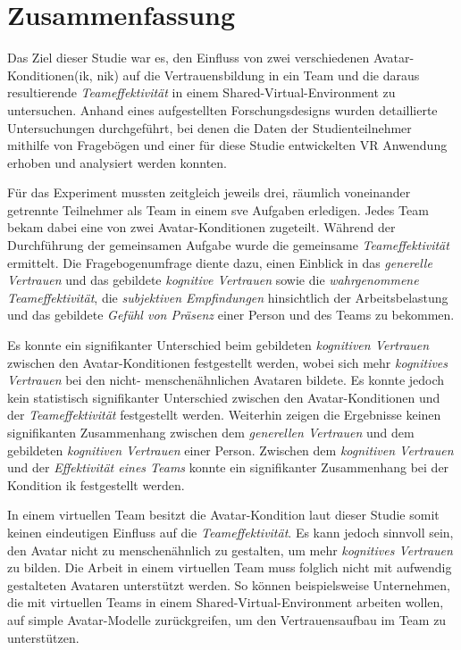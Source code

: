 \documentclass[a4paper,11pt]{article}%
\renewcommand{\\}{\vspace*{0.5\baselineskip} \newline}
\begin{document}
{{\section{Zusammenfassung}
Das Ziel dieser Studie war es, den Einfluss von zwei verschiedenen Avatar-Konditionen\newline (\ac{ik}, \ac{nik}) auf die Vertrauensbildung in ein Team und die daraus resultierende \textit{Teameffektivität} in einem Shared-Virtual-Environment zu untersuchen. 
Anhand eines aufgestellten Forschungsdesigns wurden detaillierte Untersuchungen durchgeführt, bei denen die Daten der Studienteilnehmer mithilfe von Fragebögen und einer für diese Studie entwickelten VR Anwendung erhoben und analysiert werden konnten.

Für das Experiment mussten zeitgleich jeweils drei, räumlich voneinander getrennte Teilnehmer als Team in einem \ac{sve} Aufgaben erledigen. Jedes Team bekam dabei eine von zwei Avatar-Konditionen zugeteilt. Während der Durchführung der gemeinsamen Aufgabe wurde die gemeinsame \textit{Teameffektivität} ermittelt. Die Fragebogenumfrage diente dazu, einen Einblick in das \textit{generelle Vertrauen} und das gebildete \textit{kognitive Vertrauen} sowie die \textit{wahrgenommene Teameffektivität}, die \textit{subjektiven Empfindungen} hinsichtlich der Arbeitsbelastung und das gebildete \textit{Gefühl von Präsenz} einer Person und des Teams zu bekommen.

Es konnte ein signifikanter Unterschied beim gebildeten \textit{kognitiven Vertrauen} zwischen den Avatar-Konditionen festgestellt werden, wobei sich mehr \textit{kognitives Vertrauen} bei den nicht- menschenähnlichen Avataren bildete. Es konnte jedoch kein statistisch signifikanter Unterschied zwischen den Avatar-Konditionen und der \textit{Teameffektivität} festgestellt werden. Weiterhin zeigen die Ergebnisse keinen signifikanten Zusammenhang zwischen dem \textit{generellen Vertrauen} und dem gebildeten \textit{kognitiven Vertrauen} einer Person. Zwischen dem \textit{kognitiven Vertrauen} und der \textit{Effektivität eines Teams} konnte ein signifikanter Zusammenhang bei der Kondition \ac{ik} festgestellt werden.

In einem virtuellen Team besitzt die Avatar-Kondition laut dieser Studie somit keinen eindeutigen Einfluss auf die \textit{Teameffektivität}. Es kann jedoch sinnvoll sein, den Avatar nicht zu menschenähnlich zu gestalten, um mehr \textit{kognitives Vertrauen} zu bilden.
Die Arbeit in einem virtuellen Team muss folglich nicht mit aufwendig gestalteten Avataren unterstützt werden. So können beispielsweise Unternehmen, die mit virtuellen Teams in einem Shared-Virtual-Environment arbeiten wollen, auf simple Avatar-Modelle zurückgreifen, um den Vertrauensaufbau im Team zu unterstützen.

}}
\end{document}
